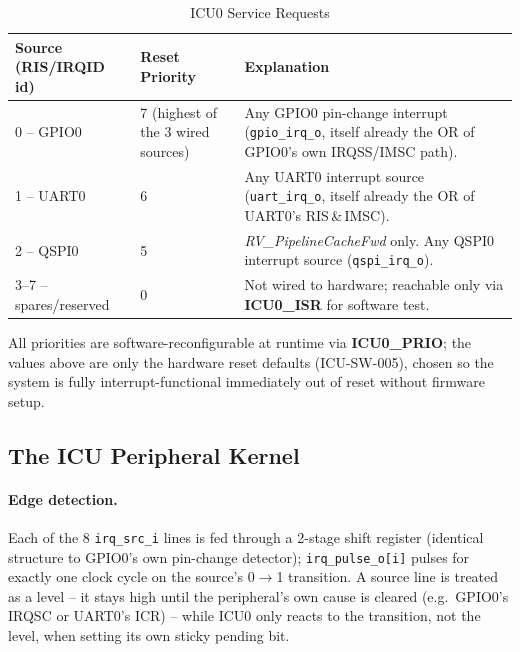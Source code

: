\begin{table}[H]
\caption{ICU0 Service Requests}
\label{tab:asIcuPer06b}
\centering
\begin{tabularx}{\textwidth}{|l |l |X|}
  \hline
  Source (RIS/IRQID id) & Reset Priority & Explanation \\
  \hline
  \hline
  0 -- GPIO0  & 7 (highest of the 3 wired sources) & Any GPIO0 pin-change
    interrupt (\texttt{gpio\_irq\_o}, itself already the OR of GPIO0's own
    IRQSS/IMSC path). \\
  \hline
  1 -- UART0  & 6 & Any UART0 interrupt source (\texttt{uart\_irq\_o},
    itself already the OR of UART0's RIS\,\&\,IMSC). \\
  \hline
  2 -- QSPI0  & 5 & \textit{RV\_PipelineCacheFwd} only. Any QSPI0
    interrupt source (\texttt{qspi\_irq\_o}). \\
  \hline
  3--7 -- spares/reserved & 0 & Not wired to hardware; reachable only via
    \textbf{ICU0\_ISR} for software test. \\
  \hline
\end{tabularx}
\end{table}

All priorities are software-reconfigurable at runtime via
\textbf{ICU0\_PRIO}; the values above are only the hardware reset
defaults (ICU-SW-005), chosen so the system is fully interrupt-functional
immediately out of reset without firmware setup.

\subsection{The ICU Peripheral Kernel}
\label{subsec:icufunc02}

\paragraph{Edge detection.} Each of the 8 \texttt{irq\_src\_i} lines is
fed through a 2-stage shift register (identical structure to GPIO0's own
pin-change detector); \texttt{irq\_pulse\_o[i]} pulses for exactly one
clock cycle on the source's 0$\to$1 transition. A source line is treated
as a level -- it stays high until the peripheral's own cause is cleared
(e.g.\ GPIO0's IRQSC or UART0's ICR) -- while ICU0 only reacts to the
transition, not the level, when setting its own sticky pending bit.

